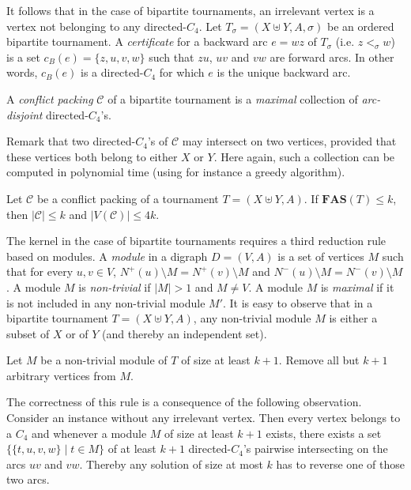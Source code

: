 It follows that in the case of bipartite tournaments, an irrelevant vertex is a vertex not belonging to any directed-$C_4$. Let $T_\sigma = (X\uplus Y,A,\sigma)$ be an ordered bipartite tournament. A \emph{certificate} for a backward arc $e = wz$ of $T_\sigma$ (i.e. $z<_{\sigma} w$) is a set $c_B(e)=\{z,u,v,w\}$ such that $zu$, $uv$ and $vw$ are forward arcs. In other words, $c_B(e)$ is a directed-$C_4$ for which $e$ is the unique backward arc. 

\begin{definition} \label{def:cpfasbt}
A \emph{conflict packing} $\mathcal{C}$ of a bipartite tournament is a \emph{maximal} collection of \emph{arc-disjoint} directed-$C_4$'s.
\end{definition}

Remark that two directed-$C_4$'s of $\mathcal{C}$ may intersect on two vertices, provided that these vertices both belong to  either $X$ or $Y$. Here again, such a collection can be computed in polynomial time (using for instance a greedy algorithm). 

\begin{observation} \label{prop:cpfasbt}
Let $\mathcal{C}$ be a conflict packing of a tournament $T=(X\uplus Y, A)$. If $\mathbf{FAS}(T)\leqslant k$, then $|\mathcal{C}| \leqslant k$ and $|V(\mathcal{C})| \leqslant 4k$.
\end{observation}


The kernel in the case of bipartite tournaments requires a third reduction rule based on modules. A \emph{module} in a digraph $D=(V,A)$ is a set of vertices $M$ such that for every $u,v\in V$, $N^+(u)\setminus M=N^+(v)\setminus M$ and $N^-(u)\setminus M=N^-(v)\setminus M$. A module $M$ is \emph{non-trivial} if $|M| > 1$ and $M \neq V$. A module $M$ is \emph{maximal} if it is not included in any non-trivial module $M'$. It is easy to observe that in a bipartite tournament $T=(X\uplus Y,A)$, any non-trivial module $M$ is either a subset of $X$ or of $Y$ (and thereby an independent set). 

\begin{polyrule} \label{rule:modulesfasbt}
Let $M$ be a non-trivial module of $T$ of size at least $k + 1$. Remove all but $k + 1$ arbitrary vertices from $M$. 
\end{polyrule}

The correctness of this rule is a consequence of the following observation. Consider an instance without any irrelevant vertex. Then every vertex belongs to a $C_4$ and whenever a module $M$ of size at least $k+1$ exists, there exists a set $\{\{t,u,v,w\}\mid t\in M \}$ of at least $k+1$ directed-$C_4$'s pairwise intersecting on the arcs $uv$ and $vw$. Thereby any solution of size at most $k$ has to reverse one of those two arcs.


